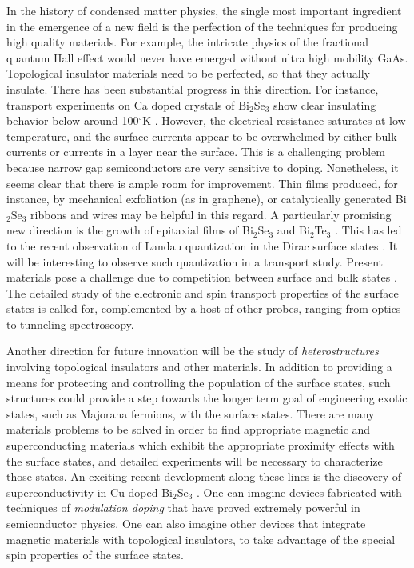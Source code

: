 \documentclass[twocolumn,floatfix,showpacs,rmp,aps]{revtex4}
\begin{document}
In the history of condensed matter physics, the single most important
ingredient in the emergence of a new field is the perfection of the
techniques for producing high quality materials.  For example, the
intricate physics of the fractional quantum Hall effect would never
have emerged without ultra high mobility GaAs. Topological insulator
materials need to be perfected, so that they actually insulate. There
has been substantial progress in this direction.  For instance,
transport experiments on Ca doped crystals of Bi$_2$Se$_3$ show clear
insulating behavior below around 100$^\circ$K \cite{checkelsky09}.
However, the electrical resistance saturates at low temperature,
and the surface currents appear to be overwhelmed by either bulk
currents or currents in a layer near the surface.  This is
a challenging problem because narrow gap semiconductors are very
sensitive to doping. Nonetheless, it seems clear that there is ample
room for improvement. Thin films produced, for instance, by
mechanical exfoliation (as in graphene), or catalytically generated
Bi$_2$Se$_3$ ribbons and wires \cite{peng09} may be helpful in this
regard.  A particularly promising new direction is the growth of
epitaxial films of Bi$_2$Se$_3$
\cite{zhangg09,zhangy10} and Bi$_2$Te$_3$ \cite{li10}. This has led to the recent observation of Landau
quantization in the Dirac surface states \cite{cheng10,hanaguri10}. It will be interesting
to observe such quantization in a transport study.  Present materials pose
a challenge due to competition between surface and bulk states \cite{taskin09,checkelsky09}.
The detailed
study of the electronic and spin transport properties of the surface
states is called for, complemented by a host of other probes, ranging
from optics to tunneling spectroscopy.

Another direction for future innovation will be the study of {\it
heterostructures} involving topological insulators and other
materials.  In addition to providing a means for protecting and controlling the
population of the surface states, such structures could provide a step towards the
longer term goal of engineering exotic states, such as Majorana
fermions, with the surface states.  There are many materials problems
to be solved in order to find appropriate magnetic and
superconducting materials which exhibit the appropriate proximity
effects with the surface states, and detailed experiments will be
necessary to characterize those states.  An exciting recent development
along these lines is the discovery of superconductivity in Cu doped
Bi$_2$Se$_3$ \cite{hor10a}.  One can imagine devices fabricated
with techniques of {\it modulation doping} that have proved extremely
powerful in semiconductor physics.  One can also imagine other devices that
integrate magnetic materials with topological insulators, to take advantage of
the special spin properties of the surface states.
\end{document}
